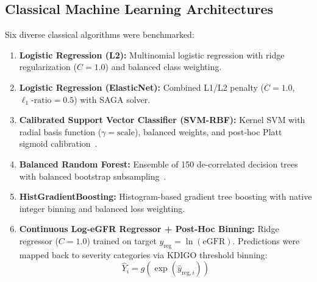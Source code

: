 \documentclass[10pt,conference]{IEEEtran}
\begin{document}
\subsection{Classical Machine Learning Architectures}
Six diverse classical algorithms were benchmarked:
\begin{enumerate}
    \item \textbf{Logistic Regression (L2):} Multinomial logistic regression with ridge regularization ($C=1.0$) and balanced class weighting.
    \item \textbf{Logistic Regression (ElasticNet):} Combined L1/L2 penalty ($C=1.0$, $\ell_1\text{-ratio} = 0.5$) with SAGA solver.
    \item \textbf{Calibrated Support Vector Classifier (SVM-RBF):} Kernel SVM with radial basis function ($\gamma = \text{scale}$), balanced weights, and post-hoc Platt sigmoid calibration~\cite{platt1999probabilistic}.
    \item \textbf{Balanced Random Forest:} Ensemble of 150 de-correlated decision trees with balanced bootstrap subsampling~\cite{breiman2001random}.
    \item \textbf{HistGradientBoosting:} Histogram-based gradient tree boosting with native integer binning and balanced loss weighting.
    \item \textbf{Continuous Log-eGFR Regressor + Post-Hoc Binning:} Ridge regressor ($C=1.0$) trained on target $y_{\text{reg}} = \ln(\text{eGFR})$. Predictions were mapped back to severity categories via KDIGO threshold binning:
    \begin{equation}
    \hat{Y}_i = g(\exp(\hat{y}_{\text{reg},i}))
    \end{equation}
\end{enumerate}
\end{document}
